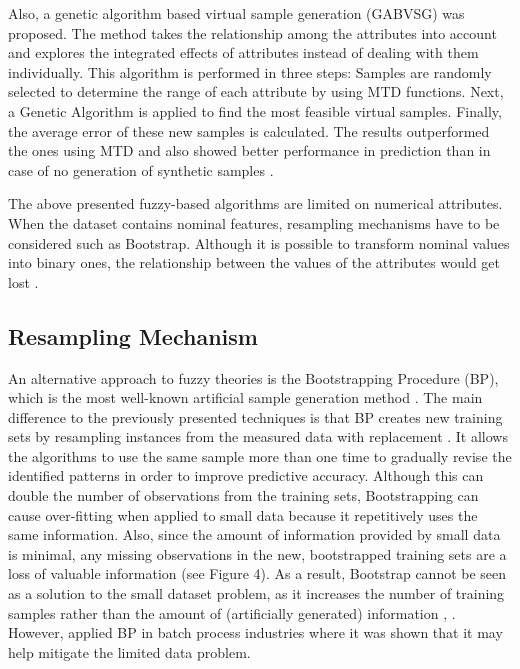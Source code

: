 \documentclass[parskip=full]{scrartcl}
\begin{document}
Also, a genetic algorithm based virtual sample generation (GABVSG) was proposed. The method takes 
the relationship among the attributes into account and explores the integrated effects of attributes 
instead of dealing with them individually. This algorithm is performed in three steps: Samples are 
randomly selected to determine the range of each attribute by using MTD functions. Next, a Genetic 
Algorithm is applied to find the most feasible virtual samples. Finally, the average error of these new 
samples is calculated. The results outperformed the ones using MTD and also showed better 
performance in prediction than in case of no generation of synthetic samples \cite{Li.2014}.

The above presented fuzzy-based algorithms are limited on numerical attributes. When the dataset 
contains nominal features, resampling mechanisms have to be considered such as Bootstrap. Although 
it is possible to transform nominal values into binary ones, the relationship between the values of the 
attributes would get lost \cite{Tsai.2008}. 

\subsection{Resampling Mechanism}

An alternative approach to fuzzy theories is the Bootstrapping Procedure (BP), which is the most 
well-known artificial sample generation method \cite{AbdulLateh.2017}. The main difference to the 
previously presented techniques is that BP creates new training sets by resampling instances from the
measured data with replacement \cite{Efron.1993}. It allows the algorithms to use the same sample more 
than one time to gradually revise the identified patterns in order to improve predictive accuracy. 
Although this can double the number of observations from the training sets, Bootstrapping can cause 
over-fitting when applied to small data because it repetitively uses the same information. Also, since the 
amount of information provided by small data is minimal, any missing observations in the new, 
bootstrapped training sets are a loss of valuable information (see Figure 4). As a result, Bootstrap 
cannot be seen as a solution to the small dataset problem, as it increases the number of training 
samples rather than the amount of (artificially generated) information \cite{Tsai.2015}, \cite{Li.2018}. 
However, \cite{Ivanescu.2006} applied BP in batch process industries where it was shown that it may 
help mitigate the limited data problem.
\end{document}
